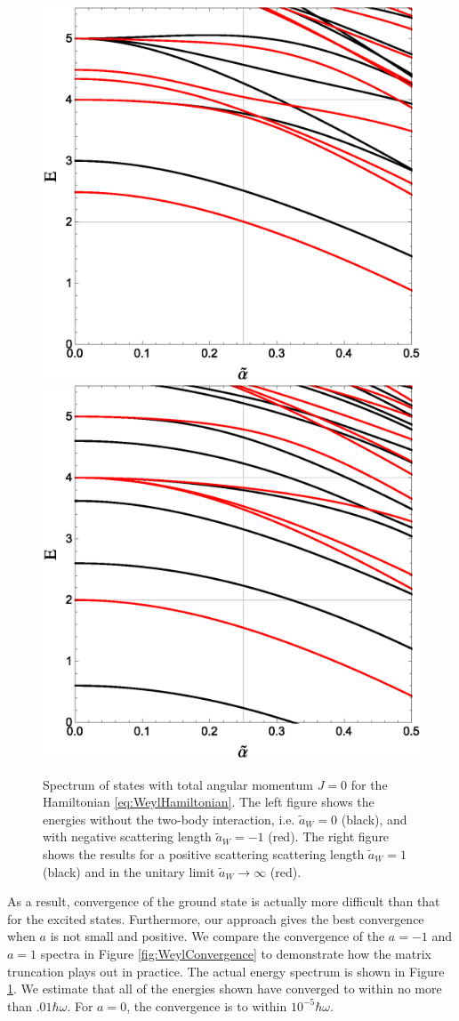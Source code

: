 \documentclass[%
 preprint,
 amsmath,amssymb,
 aps,
]{revtex4-1}
\begin{document}
\begin{figure}
\includegraphics[width=0.5\linewidth]{Figures/Weyla0am1}\nobreak
\includegraphics[width=0.5\linewidth]{Figures/Weyla1aInf}
\caption{\label{fig:WeylSpectrum} Spectrum of states with total angular momentum $J=0$ for the Hamiltonian \eqref{eq:WeylHamiltonian}. The left figure shows the energies without the two-body interaction, i.e. $\tilde{a}_W=0$ (black), and with negative scattering length $\tilde{a}_W=-1$ (red). The right figure shows the results for a positive scattering scattering length $\tilde{a}_W=1$ (black) and in the unitary limit $\tilde{a}_W\rightarrow\infty$ (red).} 
\end{figure}


As a result, convergence of the ground state is actually more difficult than that for the excited states. Furthermore, our approach gives the best convergence when $a$ is not small and positive. We compare the convergence of the $a=-1$ and $a=1$ spectra in Figure \ref{fig:WeylConvergence} to demonstrate how the matrix truncation plays out in practice. The actual energy spectrum is shown in Figure \ref{fig:WeylSpectrum}. We estimate that all of the energies shown have converged to within no more than $.01\hbar\omega$. For $a=0$, the convergence is to within $10^{-5}\hbar\omega$.
\end{document}
